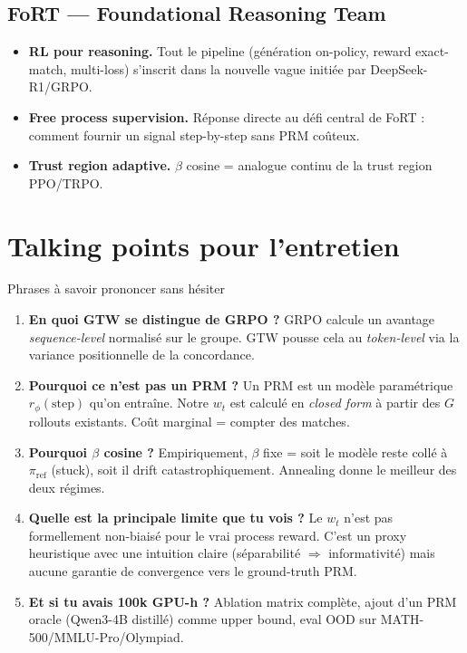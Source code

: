 \documentclass[10pt,a4paper]{article}
\begin{document}
\subsection{FoRT --- Foundational Reasoning Team}

\begin{itemize}[leftmargin=*]
  \item \textbf{RL pour reasoning.} Tout le pipeline (génération on-policy, reward exact-match, multi-loss) s'inscrit dans la nouvelle vague initiée par DeepSeek-R1/GRPO.
  \item \textbf{Free process supervision.} Réponse directe au défi central de FoRT : comment fournir un signal step-by-step sans PRM coûteux.
  \item \textbf{Trust region adaptive.} $\beta$ cosine = analogue continu de la trust region PPO/TRPO.
\end{itemize}

\section{Talking points pour l'entretien}

\begin{intuit}{Phrases à savoir prononcer sans hésiter}
\begin{enumerate}[leftmargin=*]
  \item \textbf{En quoi GTW se distingue de GRPO ?} GRPO calcule un avantage \emph{sequence-level} normalisé sur le groupe. GTW pousse cela au \emph{token-level} via la variance positionnelle de la concordance.
  \item \textbf{Pourquoi ce n'est pas un PRM ?} Un PRM est un modèle paramétrique $r_\phi(\text{step})$ qu'on entraîne. Notre $w_t$ est calculé en \emph{closed form} à partir des $G$ rollouts existants. Coût marginal = compter des matches.
  \item \textbf{Pourquoi $\beta$ cosine ?} Empiriquement, $\beta$ fixe = soit le modèle reste collé à $\pi_{\mathrm{ref}}$ (stuck), soit il drift catastrophiquement. Annealing donne le meilleur des deux régimes.
  \item \textbf{Quelle est la principale limite que tu vois ?} Le $w_t$ n'est pas formellement non-biaisé pour le vrai process reward. C'est un proxy heuristique avec une intuition claire (séparabilité $\Rightarrow$ informativité) mais aucune garantie de convergence vers le ground-truth PRM.
  \item \textbf{Et si tu avais 100k GPU-h ?} Ablation matrix complète, ajout d'un PRM oracle (Qwen3-4B distillé) comme upper bound, eval OOD sur MATH-500/MMLU-Pro/Olympiad.
\end{enumerate}
\end{intuit}
\end{document}
